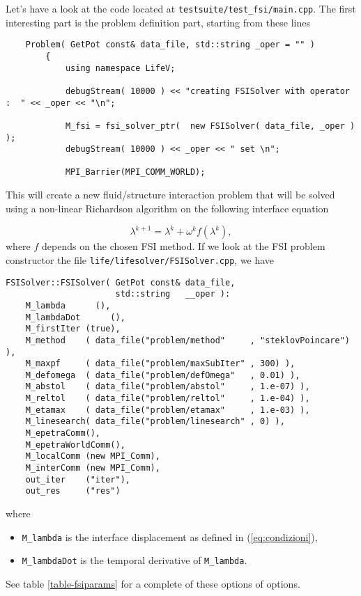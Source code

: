 Let's have a look at the code located at \verb!testsuite/test_fsi/main.cpp!. The first interesting part
is the problem definition part, starting from these lines 
\begin{verbatim}
    Problem( GetPot const& data_file, std::string _oper = "" )
        {
            using namespace LifeV;

            debugStream( 10000 ) << "creating FSISolver with operator :  " << _oper << "\n";

            M_fsi = fsi_solver_ptr(  new FSISolver( data_file, _oper ) );
            debugStream( 10000 ) << _oper << " set \n";

            MPI_Barrier(MPI_COMM_WORLD);
\end{verbatim}

This will create a new fluid/structure interaction problem that will be solved using a
non-linear Richardson algorithm on the following interface equation 

\begin{equation}\label{eqn-interface}
\lambda^{k+1}  =  \lambda^k + \omega^k f(\lambda^k),
\end{equation}
where $f$ depends on the chosen FSI method. If we look at the FSI problem constructor
the file \verb!life/lifesolver/FSISolver.cpp!, we have 

\begin{verbatim}
FSISolver::FSISolver( GetPot const& data_file,
                      std::string   __oper ):
    M_lambda      (),
    M_lambdaDot      (),
    M_firstIter (true),
    M_method    ( data_file("problem/method"     , "steklovPoincare") ),
    M_maxpf     ( data_file("problem/maxSubIter" , 300) ),
    M_defomega  ( data_file("problem/defOmega"   , 0.01) ),
    M_abstol    ( data_file("problem/abstol"     , 1.e-07) ),
    M_reltol    ( data_file("problem/reltol"     , 1.e-04) ),
    M_etamax    ( data_file("problem/etamax"     , 1.e-03) ),
    M_linesearch( data_file("problem/linesearch" , 0) ),
    M_epetraComm(),
    M_epetraWorldComm(),
    M_localComm (new MPI_Comm),
    M_interComm (new MPI_Comm),
    out_iter    ("iter"),
    out_res     ("res")
\end{verbatim}


where
\begin{itemize}
\item \verb!M_lambda! is the interface displacement as defined in (\ref{eq:condizioni}),
\item \verb!M_lambdaDot! is the temporal derivative of \verb!M_lambda!.
\end{itemize}
See table \ref{table-fsiparams} for a complete of these options of options.

